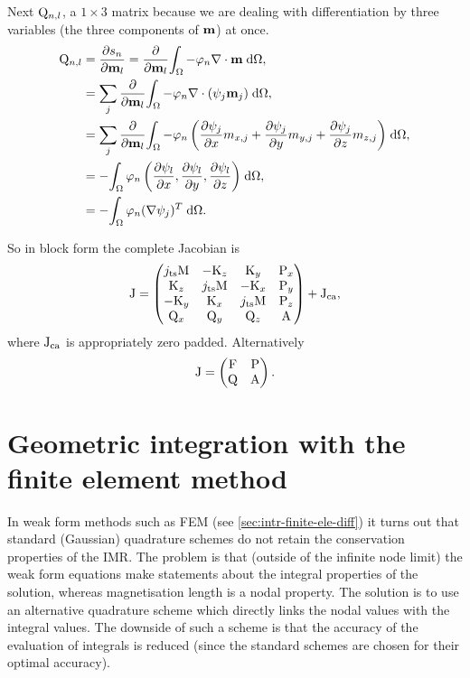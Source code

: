 Next $\mathrm{Q}_{n,l}$, a $1 \times 3$ matrix because we are dealing with differentiation by three variables (the three components of $\mathbf{m}$) at once.
\begin{equation}
  \begin{aligned}
    \mathrm{Q}_{n,l} &= \frac{\partial s_n}{\partial \mathbf{m}_l} = \frac{\partial }{\partial \mathbf{m}_l} {\int_{\Omega} { -\varphi_n \nabla \cdot \mathbf{m}} {\; \mathrm{{d}}} {\Omega}}, \\
    &= \sum_j \frac{\partial }{\partial \mathbf{m}_l} {\int_{\Omega} { -\varphi_n \nabla \cdot (\psi_j \mathbf{m}_j)} {\; \mathrm{{d}}} {\Omega}}, \\
    &= \sum_j \frac{\partial }{\partial \mathbf{m}_l} {\int_{\Omega} { -\varphi_n \left( \frac{\partial \psi_j}{\partial x} m_{x,j} 
        + \frac{\partial \psi_j}{\partial y} m_{y,j} + \frac{\partial \psi_j}{\partial z} m_{z,j} \right) } {\; \mathrm{{d}}} {\Omega}}, \\
    &= -{\int_{\Omega} { \varphi_n \left( \frac{\partial \psi_l}{\partial x}, 
        \frac{\partial \psi_l}{\partial y}, \frac{\partial \psi_l}{\partial z} \right) } {\; \mathrm{{d}}} {\Omega}}, \\
    &= -{\int_{\Omega} {\varphi_n (\nabla \psi_j)^T} {\; \mathrm{{d}}} {\Omega}}.
  \end{aligned}
\end{equation}

So in block form the complete Jacobian is
\begin{equation}
  \mathrm{J} =
  \begin{pmatrix}
    j_\mathrm{ts} \mathrm{M}    & -\mathrm{K}_z       & \mathrm{K}_y      & \mathrm{P}_x \\
    \mathrm{K}_z         & j_\mathrm{ts}\mathrm{M}    & -\mathrm{K}_x     & \mathrm{P}_y \\
    -\mathrm{K}_y        & \mathrm{K}_x      & j_\mathrm{ts} \mathrm{M} & \mathrm{P}_z \\
    \mathrm{Q}_x       & \mathrm{Q}_y      & \mathrm{Q}_z    & \mathrm{A}     \\
  \end{pmatrix} + \mathrm{J}_\mathrm{ca},
\end{equation}
where $\mathrm{J}_\mathrm{ca}$ is appropriately zero padded.
Alternatively
\begin{equation}
\mathrm{J} =
  \begin{pmatrix}
    \mathrm{F}   & \mathrm{P} \\
    \mathrm{Q}   & \mathrm{A} \\
  \end{pmatrix}.
\end{equation}



\section{Geometric integration with the finite element method}
\label{sec:nodal-integration}

In weak form methods such as FEM (see \cref{sec:intr-finite-ele-diff}) it turns out that standard (\ie Gaussian) quadrature schemes do not retain the conservation properties of the IMR.
The problem is that (outside of the infinite node limit) the weak form equations make statements about the integral properties of the solution, whereas magnetisation length is a nodal property.
The solution is to use an alternative quadrature scheme which directly links the nodal values with the integral values.
The downside of such a scheme is that the accuracy of the evaluation of integrals is reduced (since the standard schemes are chosen for their optimal accuracy).

